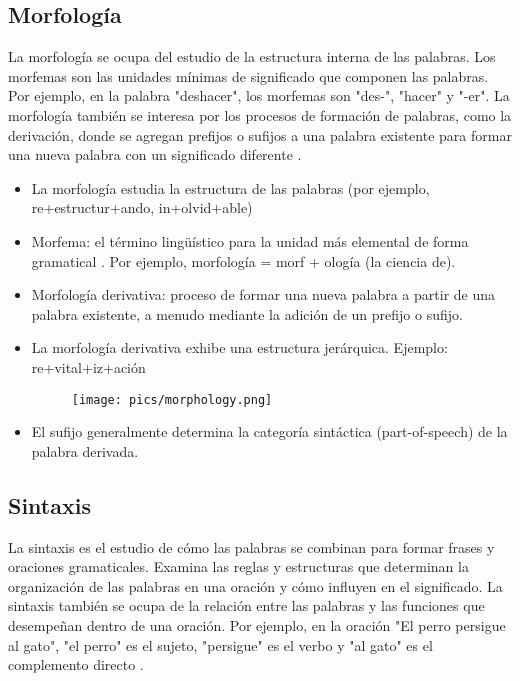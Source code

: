 \subsection{Morfología}

La morfología se ocupa del estudio de la estructura interna de las palabras. Los morfemas son las unidades mínimas de significado que componen las palabras. Por ejemplo, en la palabra "deshacer", los morfemas son "des-", "hacer" y "-er". La morfología también se interesa por los procesos de formación de palabras, como la derivación, donde se agregan prefijos o sufijos a una palabra existente para formar una nueva palabra con un significado diferente \cite{JohnsonMLSS}.

\begin{itemize}
\item La morfología estudia la estructura de las palabras (por ejemplo, re+estructur+ando, in+olvid+able) \cite{JohnsonMLSS}
\item Morfema: el término lingüístico para la unidad más elemental de forma gramatical \cite{fromkin2018introduction}. Por ejemplo, morfología = morf + ología (la ciencia de).
\item Morfología derivativa: proceso de formar una nueva palabra a partir de una palabra existente, a menudo mediante la adición de un prefijo o sufijo.
\item La morfología derivativa exhibe una estructura jerárquica. Ejemplo: re+vital+iz+ación
\begin{figure}[h]
\texttt{[image: pics/morphology.png]}
\end{figure}
\item El sufijo generalmente determina la categoría sintáctica (part-of-speech) de la palabra derivada.
\end{itemize}

\subsection{Sintaxis}

La sintaxis es el estudio de cómo las palabras se combinan para formar frases y oraciones gramaticales. Examina las reglas y estructuras que determinan la organización de las palabras en una oración y cómo influyen en el significado. La sintaxis también se ocupa de la relación entre las palabras y las funciones que desempeñan dentro de una oración. Por ejemplo, en la oración "El perro persigue al gato", "el perro" es el sujeto, "persigue" es el verbo y "al gato" es el complemento directo \cite{JohnsonMLSS}.

